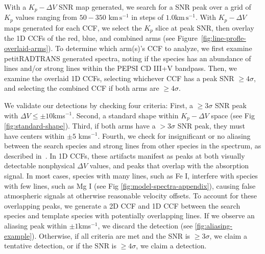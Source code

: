 \documentclass[twocolumn]{aastex631}
\begin{document}
            With a ${K_p-\Delta\!V}$ SNR map generated, we search for a SNR peak over a grid of $K_p$ values ranging from $50-350$ $\text{km}\,\text{s}^{-1}$ in steps of $1.0 \text{km}\,\text{s}^{-1}$. With $K_p-\Delta V$ maps generated for each CCF, we select the $K_p$ slice at peak SNR, then overlay the 1D CCFs of the red, blue, and combined arms (see Figure~\ref{fig:line-profle-overlaid-arms}). To determine which arm(s)'s CCF to analyze, we first examine petitRADTRANS generated spectra, noting if the species has an abundance of lines and/or strong lines within the PEPSI CD III+V bandpass. Then, we examine the overlaid 1D CCFs, selecting whichever CCF has a peak SNR $\geq4\sigma$, and selecting the combined CCF if both arms are $\geq4\sigma$.
                        
            We validate our detections by checking four criteria: First, a $\geq{3\sigma}$ SNR peak with $\Delta V \leq \pm10$kms$^{-1}$. Second, a standard shape within ${K_p-\Delta V}$ space (see Fig \ref{fig:standard-shape}). Third, if both arms have a $>{3\sigma}$ SNR peak, they must have centers within $\pm 5$ kms$^{-1}$. Fourth, we check for insignificant or no aliasing between the search species and strong lines from other species in the spectrum, as described in~\citet{Borsato2023, Petz2023}. In 1D CCFs, these artifacts manifest as peaks at both visually detectable nonphysical $\Delta V$ values, and peaks that overlap with the absorption signal. In most cases, species with many lines, such as Fe I, interfere with species with few lines, such as Mg I (see Fig \ref{fig:model-spectra-appendix}), causing false atmospheric signals at otherwise reasonable velocity offsets. To account for these overlapping peaks, we generate a 2D CCF and 1D CCF between the search species and template species with potentially overlapping lines. If we observe an aliasing peak within $\pm1$kms$^{-1}$, we discard the detection (see \ref{fig:aliasing-example}). Otherwise, if all criteria are met and the SNR is $\geq3\sigma$, we claim a tentative detection, or if the SNR is $\geq4\sigma$, we claim a detection.
\end{document}
